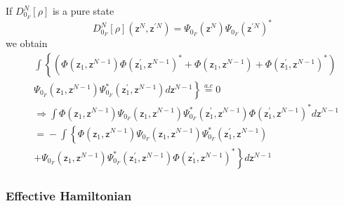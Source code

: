 \documentclass[aps,preprint]{revtex4}%
\begin{document}
If $D_{0_{F}}^{N}\left[  \rho\right]  $ is a pure state
\begin{equation}
D_{0_{F}}^{N}\left[  \rho\right]  \left(  \mathsf{z}^{N},\mathsf{z}^{\prime
N}\right)  =\Psi_{0_{F}}\left(  \mathsf{z}^{N}\right)  \Psi_{0_{F}}\left(
\mathsf{z}^{\prime N}\right)  ^{\ast}%
\end{equation}
we obtain
\begin{align}
&
{\displaystyle\int}
\left\{  \left(  \Phi\left(  \mathsf{z}_{1},\mathsf{z}^{N-1}\right)
\Phi\left(  \mathsf{z}_{1}^{\prime},\mathsf{z}^{N-1}\right)  ^{\ast}%
+\Phi\left(  \mathsf{z}_{1},\mathsf{z}^{N-1}\right)  +\Phi\left(
\mathsf{z}_{1}^{\prime},\mathsf{z}^{N-1}\right)  ^{\ast}\right)  \right.
\nonumber\\
&  \left.  \Psi_{0_{F}}\left(  \mathsf{z}_{1},\mathsf{z}^{N-1}\right)
\Psi_{0_{F}}^{\ast}\left(  \mathsf{z}_{1}^{\prime},\mathsf{z}^{N-1}\right)
d\mathsf{z}^{N-1}\right\}  \overset{a.e}{=}0\nonumber\\
&  \Rightarrow\int\Phi\left(  \mathsf{z}_{1},\mathsf{z}^{N-1}\right)
\Psi_{0_{F}}\left(  \mathsf{z}_{1},\mathsf{z}^{N-1}\right)  \Psi_{0_{F}}%
^{\ast}\left(  \mathsf{z}_{1}^{\prime},\mathsf{z}^{N-1}\right)  \Phi\left(
\mathsf{z}_{1}^{\prime},\mathsf{z}^{N-1}\right)  ^{\ast}d\mathsf{z}%
^{N-1}\nonumber\\
&  \left.  =\right.  -\int\left\{  \Phi\left(  \mathsf{z}_{1},\mathsf{z}%
^{N-1}\right)  \Psi_{0_{F}}\left(  \mathsf{z}_{1},\mathsf{z}^{N-1}\right)
\Psi_{0_{F}}^{\ast}\left(  \mathsf{z}_{1}^{\prime},\mathsf{z}^{N-1}\right)
\right. \nonumber\\
&  \left.  +\Psi_{0_{F}}\left(  \mathsf{z}_{1},\mathsf{z}^{N-1}\right)
\Psi_{0_{F}}^{\ast}\left(  \mathsf{z}_{1}^{\prime},\mathsf{z}^{N-1}\right)
\Phi\left(  \mathsf{z}_{1}^{\prime},\mathsf{z}^{N-1}\right)  ^{\ast}\right\}
d\mathsf{z}^{N-1}%
\end{align}


\subsubsection{Effective Hamiltonian}
\end{document}
